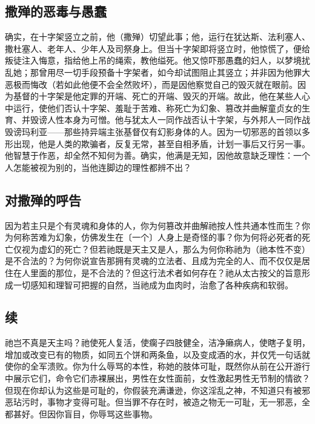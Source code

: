 \subsection{撒殚的恶毒与愚蠢}

确实，在十字架竖立之前，他（撒殚）切望此事；他，运行在犹达斯、法利塞人、撒杜塞人、老年人、少年人及司祭身上。但当十字架即将竖立时，他惊慌了，便给叛徒注入悔意，指给他上吊的绳索，教他缢死。他又惊吓那愚蠢的妇人，以梦境扰乱她；那曾用尽一切手段预备十字架者，如今却试图阻止其竖立；并非因为他罪大恶极而悔改（若如此他便不会全然败坏），而是因他察觉自己的毁灭就在眼前。因为基督的十字架是他定罪的开端、死亡的开端、毁灭的开端。故此，他在某些人心中运行，使他们否认十字架、羞耻于苦难、称死亡为幻象、篡改并曲解童贞女的生育、并毁谤人性本身为可憎。他与犹太人一同作战否认十字架，与外邦人一同作战毁谤玛利亚——那些持异端主张基督仅有幻影身体的人。因为一切邪恶的首领以多形出现，他是人类的欺骗者，反复无常，甚至自相矛盾，计划一事后又行另一事。他智慧于作恶，却全然不知何为善。确实，他满是无知，因他故意缺乏理性：一个人怎能被视为别的，当他连脚边的理性都辨不出？\par


\subsection{对撒殚的呼告}

因为若主只是个有灵魂和身体的人，你为何篡改并曲解祂按人性共通本性而生？你为何称苦难为幻象，仿佛发生在〔一个〕人身上是奇怪的事？你为何将必死者的死亡仅视为虚幻的死亡？但若祂既是天主又是人，那么为何你称祂为（祂本性不变）是不合法的？为何你说宣告那拥有灵魂的立法者、且成为完全的人、而不仅仅是居住在人里面的那位，是不合法的？但这行法术者如何存在？祂从太古按父的旨意形成一切感知和理智可把握的自然，当祂成为血肉时，治愈了各种疾病和软弱。\par


\subsection{续}

祂岂不真是天主吗？祂使死人复活，使瘸子四肢健全，洁净癞病人，使瞎子复明，增加或改变已有的物质，如同五个饼和两条鱼，以及变成酒的水，并仅凭一句话就使你的全军溃败。你为什么辱骂的本性，称她的肢体可耻，既然你从前在公开游行中展示它们，命令它们赤裸展出，男性在女性面前，女性激起男性无节制的情欲？但现在你却认为这些是可耻的，你假装充满谦逊，你这淫乱之神，不知道只有被邪恶玷污时，事物才变得可耻。但当罪不存在时，被造之物无一可耻，无一邪恶，全都甚好。但因你盲目，你辱骂这些事物。\par

